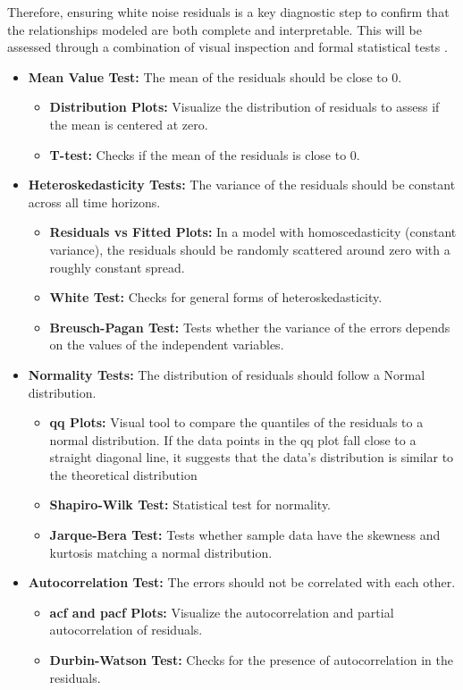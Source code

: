 \documentclass[11pt,english,a4paper,hidelinks]{book}
\begin{document}
\vspace{0.5cm}
\noindent Therefore, ensuring white noise residuals is a key diagnostic step to confirm that the relationships modeled are both complete and interpretable. This will be assessed through a combination of visual inspection and formal statistical tests \textcite{enders1948applied}. 

\begin{itemize}
    \item \textbf{Mean Value Test:} The mean of the residuals should be close to 0.
        \begin{itemize}
            \item \textbf{Distribution Plots:} Visualize the distribution of residuals to assess if the mean is centered at zero.
            \item \textbf{T-test:} Checks if the mean of the residuals is close to 0.
        \end{itemize}
    \item \textbf{Heteroskedasticity Tests:} The variance of the residuals should be constant across all time horizons.
        \begin{itemize}
            \item \textbf{Residuals vs Fitted Plots:} In a model with homoscedasticity (constant variance), the residuals should be randomly scattered around zero with a roughly constant spread.
            \item \textbf{White Test:} Checks for general forms of heteroskedasticity.
            \item \textbf{Breusch-Pagan Test:} Tests whether the variance of the errors depends on the values of the independent variables.
        \end{itemize}
    \item \textbf{Normality Tests:} The distribution of residuals should follow a Normal distribution.
        \begin{itemize}
            \item \textbf{\acrshort{qq} Plots:} Visual tool to compare the quantiles of the residuals to a normal distribution. If the data points in the \acrshort{qq} plot fall close to a straight diagonal line, it suggests that the data's distribution is similar to the theoretical distribution
            \item \textbf{Shapiro-Wilk Test:} Statistical test for normality.
            \item \textbf{Jarque-Bera Test:} Tests whether sample data have the skewness and kurtosis matching a normal distribution.
        \end{itemize}
    \item \textbf{Autocorrelation Test:} The errors should not be correlated with each other.
        \begin{itemize}
            \item \textbf{\gls{acf} and \gls{pacf} Plots:} Visualize the autocorrelation and partial autocorrelation of residuals.
            \item \textbf{Durbin-Watson Test:} Checks for the presence of autocorrelation in the residuals.
        \end{itemize}
\end{itemize}
\end{document}
